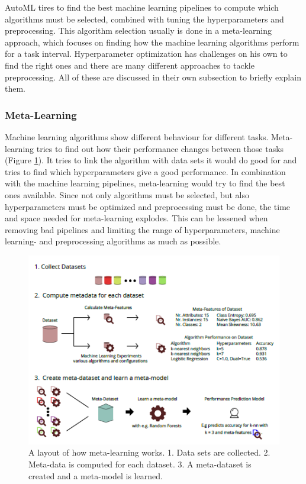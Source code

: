 \documentclass[10pt,a4paper]{article}
\begin{document}
	AutoML tires to find the best machine learning pipelines to compute which algorithms must be selected, combined with tuning the hyperparameters and preprocessing. This algorithm selection usually is done in a meta-learning approach, which focuses on finding how the machine learning algorithms perform for a task interval. Hyperparameter optimization has challenges on his own to find the right ones and there are many different approaches to tackle preprocessing. All of these are discussed in their own subsection to briefly explain them.	
	
	
	\subsubsection{Meta-Learning}
	\label{subsubsec:Meta-Learning}
	
	Machine learning algorithms show different behaviour for different tasks. Meta-learning tries to find out how their performance changes between those tasks (Figure \ref{fig:Meta-LearningLayout}). It tries to link the algorithm with data sets it would do good for and tries to find which hyperparameters give a good performance. In combination with the machine learning pipelines, meta-learning would try to find the best ones available. Since not only algorithms must be selected, but also hyperparameters must be optimized and preprocessing must be done, the time and space needed for meta-learning explodes. This can be lessened when removing bad pipelines and limiting the range of hyperparameters, machine learning- and preprocessing algorithms as much as possible. 

	\begin{figure}
		\label{fig:Meta-LearningLayout}
		\includegraphics[scale=1]{Meta-LearningLayout.png}
		\caption{A layout of how meta-learning works. 1. Data sets are collected. 2. Meta-data is computed for each dataset. 3. A meta-dataset is created and a meta-model is learned.\cite{Gijsbers2017Thesis}}
	\end{figure}
	
\end{document}
